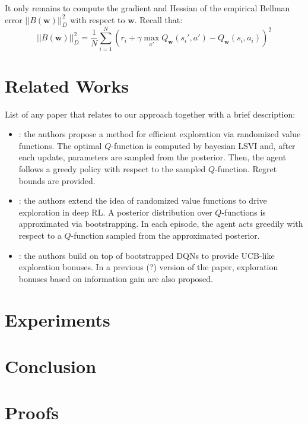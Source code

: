 \documentclass{article}
\begin{document}
It only remains to compute the gradient and Hessian of the empirical Bellman error $||B(\bm{w})||_{D}^2$ with respect to $\bm{w}$. Recall that:
\begin{equation}
||B(\bm{w})||_{D}^2 = \frac{1}{N}\sum_{i=1}^N \left( r_i + \gamma\max_{a'}Q_{\bm{w}}(s_i',a') - Q_{\bm{w}}(s_i,a_i) \right)^2
\end{equation}



\section{Related Works}

List of any paper that relates to our approach together with a brief description:
\begin{itemize}
\item \cite{osband2014generalization}: the authors propose a method for efficient exploration via randomized value functions. The optimal $Q$-function is computed by bayesian LSVI and, after each update, parameters are sampled from the posterior. Then, the agent follows a greedy policy with respect to the sampled $Q$-function. Regret bounds are provided.
\item \cite{osband2016deep}: the authors extend the idea of randomized value functions to drive exploration in deep RL. A posterior distribution over $Q$-functions is approximated via bootstrapping. In each episode, the agent acts greedily with respect to a $Q$-function sampled from the approximated posterior.
\item \cite{chen2017ucb}: the authors build on top of bootstrapped DQNs to provide UCB-like exploration bonuses. In a previous (?) version of the paper, exploration bonuses based on information gain are also proposed.
\end{itemize}

\section{Experiments}

\section{Conclusion}

{\small 


}
\newpage
\appendix

\section{Proofs}
\end{document}
